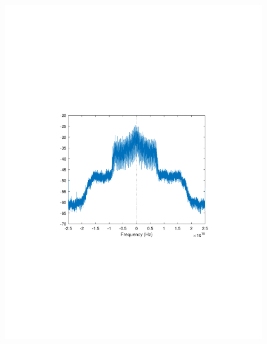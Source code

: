 \begin{refsection}
\begin{figure}[H]
	\centering
	\begin{minipage}{0.30\textwidth}
		\centering
		\includegraphics[clip, trim=4cm 8cm 4cm 8cm, width=1\textwidth]{./sdf/m_qam_system/figures/expResults/intradyne/1_16GBdInSig13dB_AfFec.pdf}
		\label{fig:16GBdEyeAftFec}
	\end{minipage}
	\begin{minipage}{0.30\textwidth}
		\centering

\end{minipage}
\end{figure}
\end{refsection}
